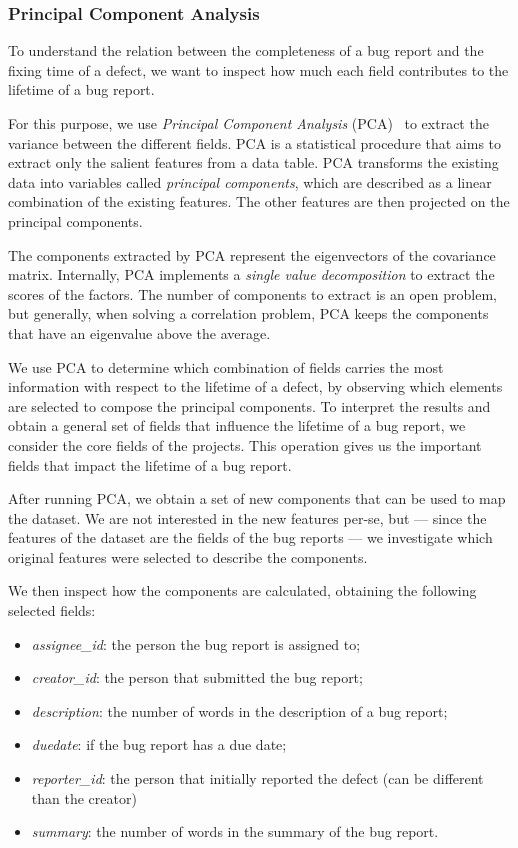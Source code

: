 \subsubsection{Principal Component Analysis}\label{sec:model-pca}

To understand the relation between the completeness of a bug report and the fixing time of a defect, we want to inspect how much each field contributes to  the lifetime of a bug report.

For this purpose, we use \emph{Principal Component Analysis} (PCA)~\cite{Abdi2010a} to extract the variance between the different fields.
PCA is a statistical procedure that aims to extract only the salient features from a data table.
PCA transforms the existing data into variables called \emph{principal components}, which are described as a linear combination of the existing features.
The other features are then projected on the principal components.


The components extracted by PCA represent the eigenvectors of the covariance matrix.
Internally, PCA implements a \emph{single value decomposition} to extract the scores of the factors.
The number of components to extract is an open problem, but generally, when solving a correlation problem, PCA keeps the components that have an eigenvalue above the average.

We use PCA to determine which combination of fields carries the most information with respect to the lifetime of a defect, by observing which elements are selected to compose the principal components.
To interpret the results and obtain a general set of fields that influence the lifetime of a bug report, we consider the core fields of the projects.
This operation gives us the important fields that impact the lifetime of a bug report.

After running PCA, we obtain a set of new components that can be used to map the dataset.
We are not interested in the new features per-se, but --- since the features of the dataset are the fields of the bug reports --- we investigate which original features were selected to describe the components.

We then inspect how the components are calculated, obtaining the following selected fields:

\begin{itemize}[$\circ$]
  \item \emph{assignee\_id}: the person the bug report is assigned to;
  \item \emph{creator\_id}: the person that submitted the bug report;
  \item \emph{description}: the number of words in the description of a bug report;
  \item \emph{duedate}: if the bug report has a due date;
  \item \emph{reporter\_id}: the person that initially reported the defect (can be different than the creator)
  \item \emph{summary}: the number of words in the summary of the bug report.
\end{itemize}

